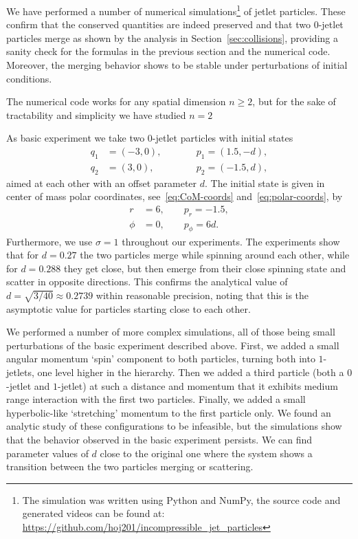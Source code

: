 \documentclass[12pt]{amsart}
\begin{document}
We have performed a number of numerical simulations\footnote{%
  The simulation was written using Python and NumPy, the source code
  and generated videos can be found at:
  \url{https://github.com/hoj201/incompressible_jet_particles}%
} of jetlet particles. These confirm that the conserved
quantities are indeed preserved and that two $0$-jetlet particles
merge as shown by the analysis in Section~\ref{sec:collisions},
providing a sanity check for the formulas in the previous section and
the numerical code. Moreover, the merging behavior shows to be stable
under perturbations of initial conditions.

The numerical code works for any spatial dimension $n \ge 2$, but for
the sake of tractability and simplicity we have studied $n = 2$ 

As basic experiment we take two $0$-jetlet particles with initial
states
\begin{equation}\label{eq:exp1-initial}
  \begin{alignedat}{2}
    q_1 &= (-3, 0), &\qquad& p_1 = ( 1.5,-d), \\
    q_2 &= ( 3, 0), &      & p_2 = (-1.5, d),
  \end{alignedat}
\end{equation}
aimed at each other with an offset parameter $d$.
The initial state is given in center of mass polar coordinates,
see~\eqref{eq:CoM-coords} and~\eqref{eq:polar-coords}, by
\begin{align*}
    r    &= 6, \qquad p_r    = -1.5, \\
    \phi &= 0, \qquad p_\phi = 6d.
\end{align*}
Furthermore, we use
$\sigma = 1$ throughout our experiments. The experiments show that for
$d = 0.27$ the two particles merge while spinning around each other,
while for $d = 0.288$ they get close, but then emerge from their close
spinning state and scatter in opposite directions. This confirms the
analytical value of $d = \sqrt{3/40} \approx 0.2739$ within reasonable
precision, noting that this is the asymptotic value for particles
starting close to each other.

We performed a number of more complex simulations, all of
those being small perturbations of the basic experiment described
above. First, we added a small angular momentum `spin' component to
both particles, turning both into $1$-jetlets, one level higher in the
hierarchy. Then we added a third particle (both a $0$-jetlet and
$1$-jetlet) at such a distance and momentum that it exhibits medium
range interaction with the first two particles. Finally, we added a
small hyperbolic-like `stretching' momentum to the first particle
only. We found an analytic study of these configurations to be
infeasible, but the simulations show that the behavior observed in the basic
experiment persists. We can find parameter values of $d$ close to the
original one where the system shows a transition between the two
particles merging or scattering.
\end{document}
